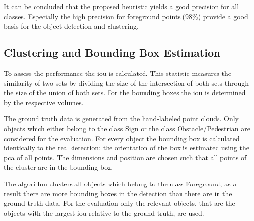 It can be concluded that the proposed heuristic yields a good precision for all classes. 
Especially the high precision for foreground points ($98\%$) provide a good basis for the object detection and clustering.

\subsection{Clustering and Bounding Box Estimation} \label{sec:eval:iou}
To assess the performance the \ac{iou} is calculated. 
This statistic measures the similarity of two sets by dividing the size of the intersection of both sets through the size of the union of both sets. 
For the bounding boxes the \ac{iou} is determined by the respective volumes.

The ground truth data is generated from the hand-labeled point clouds. Only objects which either belong to the class Sign or the class Obstacle/Pedestrian are considered for the evaluation.
For every object the bounding box is calculated identically to the real detection: the orientation of the box is estimated using the \ac{pca} of all points. The dimensions and
position are chosen such that all points of the cluster are in the bounding box.

The algorithm clusters all objects which belong to the class Foreground, as a result there are more bounding boxes in the detection than there are in the ground truth data.
For the evaluation only the relevant objects, that are the objects with the largest \ac{iou} relative to the ground truth, are used.

